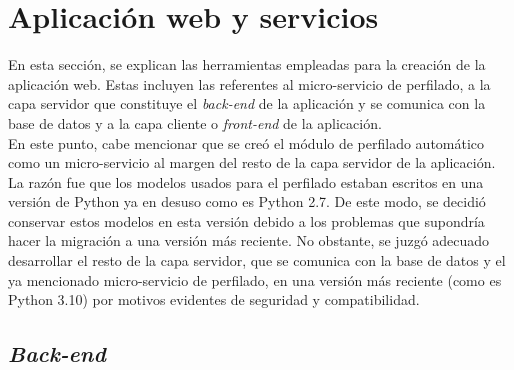 \section{Aplicación web y servicios}
En esta sección, se explican las herramientas empleadas para la creación de la aplicación web. Estas incluyen las referentes al micro-servicio de perfilado, a la capa servidor que constituye el \textit{back-end} de la aplicación y se comunica con la base de datos y a la capa cliente o \textit{front-end} de la aplicación.\\
En este punto, cabe mencionar que se creó el módulo de perfilado automático como un micro-servicio al margen del resto de la capa servidor de la aplicación. La razón fue que los modelos usados para el perfilado estaban escritos en una versión de Python ya en desuso como es Python 2.7. De este modo, se decidió conservar estos modelos en esta versión debido a los problemas que supondría hacer la migración a una versión más reciente. No obstante, se juzgó adecuado desarrollar el resto de la capa servidor, que se comunica con la base de datos y el ya mencionado micro-servicio de perfilado, en una versión más reciente (como es Python 3.10) por motivos evidentes de seguridad y compatibilidad.
\subsection{\textit{Back-end}}
